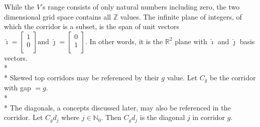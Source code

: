 \documentclass{article}
\newcommand*{\set}[1]{\mathbb{#1}}
\begin{document}
While the $V$'s range consists of only natural numbers including zero, the two dimensional grid space contains all $\set{Z}$ values. The infinite plane of integers, of which the corridor is a subset, is the span of unit  vectors
$\hat{\imath} = \begin{bmatrix}1\\0\\\end{bmatrix} \text{and }  
\hat{\jmath} = \begin{bmatrix}0\\1\\\end{bmatrix}\text{.}$ In other words, it is the $\set{R}^2$ plane with $\hat{\imath}$ and $\hat{\jmath}$ basis vectors.\\*\\*%
Skewed top corridors may be referenced by their $g$ value. Let $C_g$ be the corridor with gap $=g$.\\*\\*
The diagonals, a concepts discussed later, may also be referenced in the corridor. Let $C_gd_j$ where $j \in \set{N}_0$. Then $C_gd_j$ is the diagonal $j$ in corridor $g$.
\end{document}

